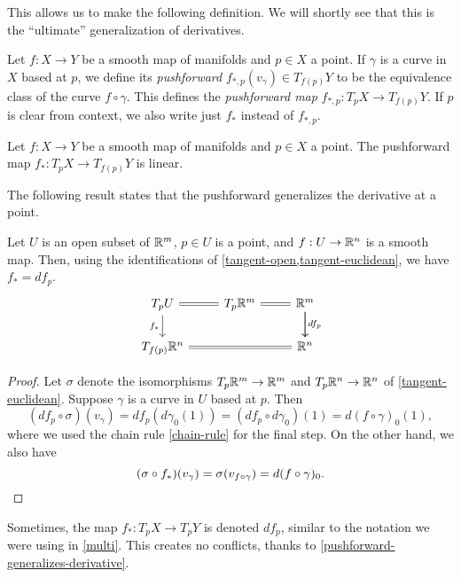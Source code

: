 
This allows us to make the following definition. We will shortly see that this is the ``ultimate'' generalization of derivatives. 

\begin{definition} 
	Let $f : X \to Y$ be a smooth map of manifolds and $p \in X$ a point. If $\gamma$ is a curve in $X$ based at $p$, we define its \emph{pushforward} $f_{*,p}(v_\gamma) \in T_{f(p)}Y$ to be the equivalence class of the curve $f \circ \gamma$. This defines the \emph{pushforward map} $f_{*,p} : T_p X \to T_{f(p)} Y$. If $p$ is clear from context, we also write just $f_*$ instead of $f_{*,p}$. 
\end{definition}

\begin{proposition}
	Let $f : X \to Y$ be a smooth map of manifolds and $p \in X$ a point. The pushforward map $f_* : T_p X \to T_{f(p)} Y$ is linear. 
\end{proposition}


The following result states that the pushforward generalizes the derivative at a point. 

\begin{proposition} \label{pushforward-generalizes-derivative}
	Let $U$ is an open subset of $\mathbb{R}^m$, $p \in U$ is a point, and $f : U \to \mathbb{R}^n$ is a smooth map. Then, using the identifications of \cref{tangent-open,tangent-euclidean}, we have $f_* = df_p$.
	\[ \begin{tikzcd} T_p U \ar[equals]{r} \ar{d}[swap]{f_*} & T_p \R^m \ar[equals]{r} & \R^m \ar{d} \ar{d}{df_p} \\ T_{f(p)} \R^n \ar[equals]{rr} & & \R^n \end{tikzcd} \]
\end{proposition}

\begin{proof}
	Let $\sigma$ denote the isomorphisms $T_p \mathbb{R}^m \to \mathbb{R}^m$ and $T_p \mathbb{R}^n \to \mathbb{R}^n$ of \cref{tangent-euclidean}. Suppose $\gamma$ is a curve in $U$ based at $p$. Then
	\[  (df_p \circ \sigma)(v_\gamma) = df_p(d\gamma_0(1)) = (df_p \circ d\gamma_0)(1) = d(f \circ \gamma)_0(1), \]
	where we used the chain rule \ref{chain-rule} for the final step. On the other hand, we also have
	\[ (\sigma \circ f_*)(v_\gamma) = \sigma(v_{f \circ \gamma}) = d(f \circ \gamma)_0. \qedhere \]
\end{proof}

\begin{remark}
	Sometimes, the map $f_* : T_p X \to T_p Y$ is denoted $df_p$, similar to the notation we were using in \cref{multi}. This creates no conflicts, thanks to \cref{pushforward-generalizes-derivative}.
\end{remark}

